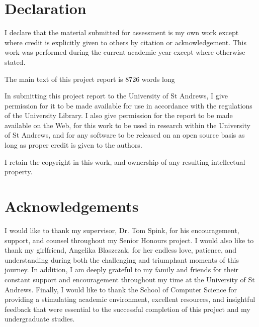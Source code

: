 \chapter*{Declaration}
I declare that the material submitted for assessment is my own work except
where credit is explicitly given to others by citation or acknowledgement. This
work was performed during the current academic year except where otherwise
stated.

The main text of this project report is 8726 words long

In submitting this project report to the University of St Andrews, I give
permission for it to be made available for use in accordance with the
regulations of the University Library. I also give permission for the report to
be made available on the Web, for this work to be used in research within the
University of St Andrews, and for any software to be released on an open source
basis as long as proper credit is given to the authors.


I retain the copyright in this work, and ownership of any resulting intellectual property.

{\let\clearpage\relax \chapter*{Acknowledgements}}
I would like to thank my supervisor, Dr. Tom Spink, for his encouragement, support, and counsel throughout my Senior Honours project. I would also like to thank my girlfriend, Angelika Blaszczak, for her endless love, patience, and understanding during both the challenging and triumphant moments of this journey. In addition, I am deeply grateful to my family and friends for their constant support and encouragement throughout my time at the University of St Andrews. Finally, I would like to thank the School of Computer Science for providing a stimulating academic environment, excellent resources, and insightful feedback that were essential to the successful completion of this project and my undergraduate studies.
